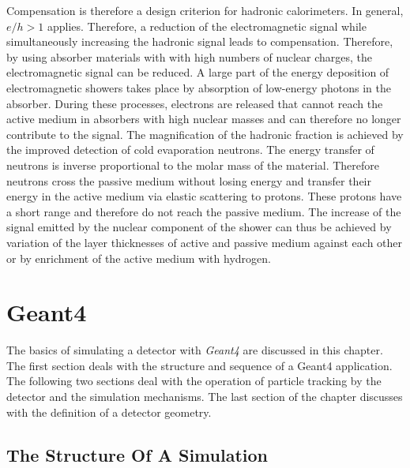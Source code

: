 \documentclass[12pt, a4paper]{thesis}
\begin{document}
Compensation is therefore a design criterion for hadronic
calorimeters. In general, \(e / h > 1\) applies. Therefore, a
reduction of the electromagnetic signal while simultaneously
increasing the hadronic signal leads to compensation. Therefore, by
using absorber materials with with high numbers of nuclear charges,
the electromagnetic signal can be reduced. A large part of the energy
deposition of electromagnetic showers takes place by absorption of
low-energy photons in the absorber. During these processes, electrons are
released that cannot reach the active medium in absorbers with high
nuclear masses and can therefore no longer contribute to the
signal. The magnification of the hadronic fraction is achieved by the
improved detection of cold evaporation neutrons. The energy transfer
of neutrons is inverse proportional to the molar mass of the
material. Therefore neutrons cross the passive medium without losing
energy and transfer their energy in the active medium via elastic
scattering to protons. These protons have a short range and therefore
do not reach the passive medium. The increase of the signal emitted by
the nuclear component of the shower can thus be achieved by variation
of the layer thicknesses of active and passive medium against each
other or by enrichment of the active medium with hydrogen.

\chapter{Geant4}
\label{sec:orgc423253}

The basics of simulating a detector with \emph{Geant4}  \cite{geant_simul_toolk} are discussed in this
chapter. The first section deals with the structure and sequence of a Geant4
application. The following two sections deal with the operation of particle
tracking by the detector and the simulation mechanisms. The last section of the
chapter discusses with the definition of a detector geometry.


\section{The Structure Of A Simulation}
\label{sec:org08164e5}
\end{document}
